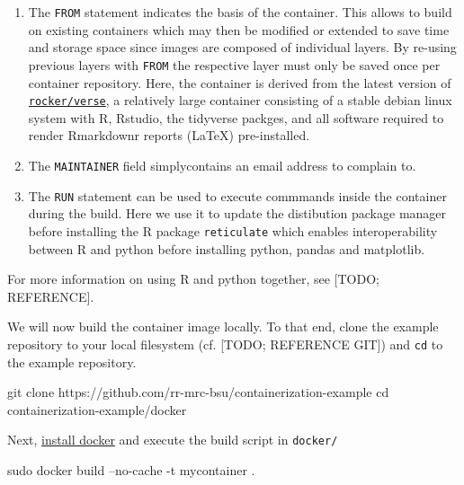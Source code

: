 \documentclass[]{book}
\newenvironment{Shaded}{\begin{snugshade}}{\end{snugshade}}
\newcommand{\FunctionTok}[1]{\textcolor[rgb]{0.00,0.00,0.00}{#1}}
\newcommand{\BuiltInTok}[1]{#1}
\newcommand{\NormalTok}[1]{#1}
\providecommand{\tightlist}{%
  \setlength{\itemsep}{0pt}\setlength{\parskip}{0pt}}
\begin{document}
\begin{enumerate}
\def\labelenumi{\arabic{enumi}.}
\tightlist
\item
  The \texttt{FROM} statement indicates the basis of the container. This
  allows to build on existing containers which may then be modified or
  extended to save time and storage space since images are composed of
  individual layers. By re-using previous layers with \texttt{FROM} the
  respective layer must only be saved once per container repository.
  Here, the container is derived from the latest version of
  \href{https://www.rocker-project.org/}{\texttt{rocker/verse}}, a
  relatively large container consisting of a stable debian linux system
  with R, Rstudio, the tidyverse packges, and all software required to
  render Rmarkdownr reports (LaTeX) pre-installed.
\item
  The \texttt{MAINTAINER} field simplycontains an email address to
  complain to.
\item
  The \texttt{RUN} statement can be used to execute commmands inside the
  container during the build. Here we use it to update the distibution
  package manager before installing the R package \texttt{reticulate}
  which enables interoperability between R and python before installing
  python, pandas and matplotlib.
\end{enumerate}

For more information on using R and python together, see {[}TODO;
REFERENCE{]}.

We will now build the container image locally. To that end, clone the
example repository to your local filesystem (cf. {[}TODO; REFERENCE
GIT{]}) and \texttt{cd} to the example repository.

\begin{Shaded}
\begin{Highlighting}[]
\FunctionTok{git}\NormalTok{ clone https://github.com/rr-mrc-bsu/containerization-example}
\BuiltInTok{cd}\NormalTok{ containerization-example/docker}
\end{Highlighting}
\end{Shaded}

Next, \href{https://docs.docker.com/install/}{install docker} and
execute the build script in \texttt{docker/}

\begin{Shaded}
\begin{Highlighting}[]
\FunctionTok{sudo}\NormalTok{ docker build --no-cache -t mycontainer .}
\end{Highlighting}
\end{Shaded}
\end{document}
